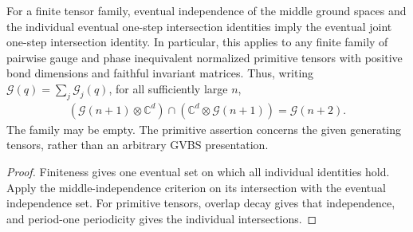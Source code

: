 \begin{lemma}
    \label{thm:primitive_joint_intersection_from_overlap}
    \leanok
    For a finite tensor family, eventual independence of the middle ground
    spaces and the individual eventual one-step intersection identities
    imply the eventual joint one-step intersection identity.
    In particular, this applies to any finite family of pairwise gauge and
    phase inequivalent normalized primitive tensors with positive bond
    dimensions and faithful invariant matrices. Thus, writing
    $\mathcal G(q)=\sum_j\mathcal G_j(q)$, for all sufficiently large $n$,
    \begin{align}
        (\mathcal G(n+1)\otimes\mathbb C^d)
        \cap(\mathbb C^d\otimes\mathcal G(n+1))
        =\mathcal G(n+2).
    \end{align}
    The family may be empty. The primitive assertion concerns the given
    generating tensors, rather than an arbitrary GVBS presentation.
\end{lemma}
\begin{proof}\leanok
    Finiteness gives one eventual set on which all individual identities
    hold. Apply the middle-independence criterion on its intersection with
    the eventual independence set. For primitive tensors, overlap decay
    gives that independence, and period-one periodicity gives the
    individual intersections.
\end{proof}

